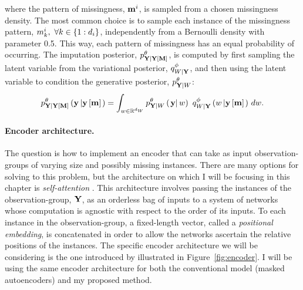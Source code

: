\documentclass[../thesis.tex]{subfiles}
\begin{document}
where the pattern of missingness, $\mathbf{{m}}^i$, is sampled from a chosen missingness density. The most common choice is to sample each instance of the missingness pattern, $m^i_k, ~ \forall k \in \{1:d_i\}$, independently from a Bernoulli density with parameter 0.5. This way, each pattern of missingness has an equal probability of occurring. The imputation posterior, $\myfunc{p}^{\theta}_{\mygroup{\myrv{y}} | \mygroup{\myrv{y}} \left[ \mygroup{\myrv{m}} \right]}$, is computed by first sampling the latent variable from the variational posterior, $\myfunc{q}^{\phi}_{\myrv{w} | \mygroup{\myrv{y}}}$, and then using the latent variable to condition the generative posterior, $\myfunc{p}^{\theta}_{\mygroup{\myrv{y}} | \myrv{w}}$:
\[
    \myfunc{p}^{\theta}_{\mygroup{\myrv{y}} | \mygroup{\myrv{y}} \left[ \mygroup{\myrv{m}} \right]} \left( \mygroup{\myvect{y}} \left\vert \mygroup{\myvect{y}} \left[ \mygroup{\myvect{m}} \right] \right. \right)
    = 
    \int_{\myvect{w} \in \mathbb{R}^{\mydim{w}}} \myfunc{p}^{\theta}_{\mygroup{\myrv{y}} | \myrv{w}} \left( \left. \mygroup{\myvect{y}} \right\vert \myvect{w} \right) 
    ~
    \myfunc{q}^{\phi}_{\myrv{w} | \mygroup{\myrv{y}}} \left( \myvect{w} \left\vert \mygroup{\myvect{y}} \left[ \mygroup{\myvect{m}} \right] \right. \right) \, d\myvect{w}.
\]  

\paragraph{Encoder architecture.} The question is how to implement an encoder that can take as input observation-groups of varying size and possibly missing instances. There are many options for solving to this problem, but the architecture on which I will be focusing in this chapter is \textit{self-attention} \citep{vaswaniAttentionAllYou2017}. This architecture involves passing the instances of the observation-group, $\mygroup{\myrv{y}}$, as an orderless bag of inputs to a system of networks whose computation is agnostic with respect to the order of its inputs. To each instance in the observation-group, a fixed-length vector, called a \textit{positional embedding}, is concatenated in order to allow the networks ascertain the relative positions of the instances. The specific encoder architecture we will be considering is the one introduced by \citet{ilseAttentionbasedDeepMultiple2018} illustrated in Figure~\ref{fig:encoder}. I will be using the same encoder architecture for both the conventional model (masked autoencoders) and my proposed method.
\end{document}
